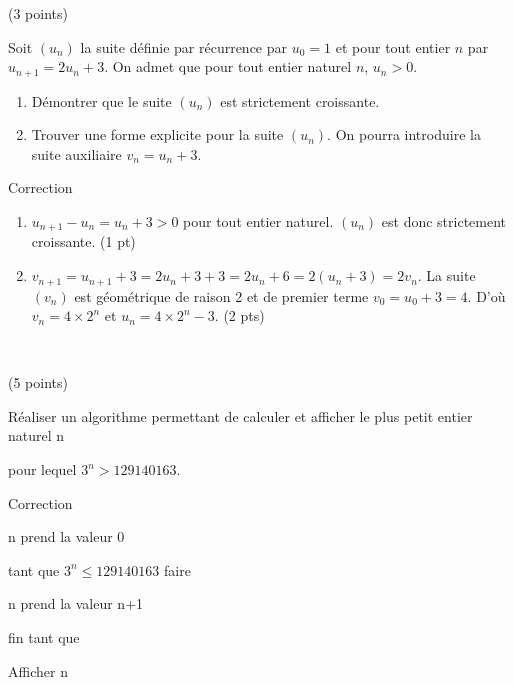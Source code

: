 \documentclass[a4paper,11pt]{article}
\theoremstyle{break}
\begin{document}
  \begin{exo}(3 points)

Soit $(u_n)$ la suite définie par récurrence par $u_0=1$ et pour tout entier $n$ par 
$u_{n+1}=2 u_n +3$. On admet que pour tout entier naturel $n$, $u_n>0$.

\begin{enumerate}
  \item Démontrer que le suite $(u_n)$ est strictement croissante.
  \item Trouver une forme explicite pour la suite $(u_n)$. On pourra introduire la suite auxiliaire
  $v_n=u_n+3$.
\end{enumerate}

\begin{correction}

Correction
\begin{enumerate}
 \item $u_{n+1}-u_n=u_n+3>0$ pour tout entier naturel. $(u_n)$ est donc strictement croissante. (1 pt)
 \item $v_{n+1}=u_{n+1}+3=2 u_n+3+3=2 u_n +6=2(u_n+3)=2 v_n$. La suite $(v_n)$ est g\'eom\'etrique
  de raison 2 et de premier terme $v_0=u_0+3=4$. D'o\`u $v_n=4 \times 2^n$ et $u_n=4 \times 2^n-3$. (2 pts)
\end{enumerate}


\end{correction}


\end{exo}

 ~
  \vspace{1cm} 
 
\begin{exo}(5 points)
~
      \vspace{0.25cm}
      
      Réaliser un algorithme permettant de calculer et afficher le plus petit entier naturel n
      
      pour lequel $3^n>129140163$.
      
\begin{correction}

Correction

      n prend la valeur 0
 
      tant que $3^n \leq 129140163$ faire
      
      n prend la valeur n+1
      
      fin tant que
      
      Afficher n
      
\end{correction}      
      
      
\end{exo}      
\end{document}
